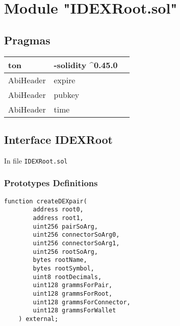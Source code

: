 
\section{Module "IDEXRoot.sol"}


\subsection{Pragmas}


\noindent\begin{tabular}{|l|l|p{5cm}|}\hline
ton & -solidity \^{}0.45.0 &\\\hline
AbiHeader &  expire &\\\hline
AbiHeader &  pubkey &\\\hline
AbiHeader &  time &\\\hline
\end{tabular}


\subsection{Interface IDEXRoot}


In file {\tt IDEXRoot.sol}

\subsubsection{Prototypes Definitions}

\vspace{2cm}

\begin{lstlisting}[firstnumber=7]
	function createDEXpair(
		address root0,
		address root1,
		uint256 pairSoArg,
		uint256 connectorSoArg0,
		uint256 connectorSoArg1,
		uint256 rootSoArg,
		bytes rootName,
		bytes rootSymbol,
		uint8 rootDecimals,
		uint128 grammsForPair,
		uint128 grammsForRoot,
		uint128 grammsForConnector,
		uint128 grammsForWallet
	) external;
\end{lstlisting}
